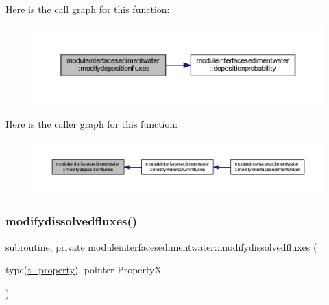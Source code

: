 Here is the call graph for this function\+:\nopagebreak
\begin{figure}[H]
\begin{center}
\leavevmode
\includegraphics[width=350pt]{namespacemoduleinterfacesedimentwater_a5d9003ebb144c9e66fe6235c416ea685_cgraph}
\end{center}
\end{figure}
Here is the caller graph for this function\+:\nopagebreak
\begin{figure}[H]
\begin{center}
\leavevmode
\includegraphics[width=350pt]{namespacemoduleinterfacesedimentwater_a5d9003ebb144c9e66fe6235c416ea685_icgraph}
\end{center}
\end{figure}
\mbox{\label{namespacemoduleinterfacesedimentwater_ac7453c783a3170a319fb2e8f0bc6af3b}} 
\subsubsection{\texorpdfstring{modifydissolvedfluxes()}{modifydissolvedfluxes()}}
{\footnotesize\ttfamily subroutine, private moduleinterfacesedimentwater\+::modifydissolvedfluxes (\begin{DoxyParamCaption}\item[{type(\mbox{\hyperlink{structmoduleinterfacesedimentwater_1_1t__property}{t\+\_\+property}}), pointer}]{PropertyX }\end{DoxyParamCaption})\hspace{0.3cm}{\ttfamily [private]}}


